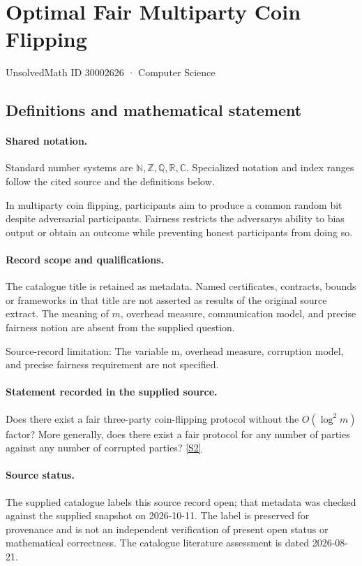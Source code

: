 \documentclass[11pt]{article}
\newcommand{\sref}[2]{\hyperlink{source:#1:#2}{[S#2]}}
\begin{document}
\setcounter{section}{30002625}
\section{Optimal Fair Multiparty Coin Flipping}\label{30002626}
{\small\sffamily UnsolvedMath ID 30002626 · Computer Science}
\subsection{Definitions and mathematical statement}

\paragraph{Shared notation.}Standard number systems are $\mathbb N,\mathbb Z,\mathbb Q,\mathbb R,\mathbb C$. Specialized notation and index ranges follow the cited source and the definitions below.


In multiparty coin flipping, participants aim to produce a common random bit despite adversarial participants. Fairness restricts the adversary\textquotesingle s ability to bias output or obtain an outcome while preventing honest participants from doing so.
\paragraph{Record scope and qualifications.}
The catalogue title is retained as metadata. Named certificates, contracts, bounds or frameworks in that title are not asserted as results of the original source extract.
The meaning of $m$, overhead measure, communication model, and precise fairness notion are absent from the supplied question.

Source-record limitation: The variable m, overhead measure, corruption model, and precise fairness requirement are not specified.
\paragraph{Statement recorded in the supplied source.}
Does there exist a fair three-party coin-flipping protocol without the $O(\log^2 m)$ factor? More generally, does there exist a fair protocol for any number of parties against any number of corrupted parties? \sref{30002626}{2}
\paragraph{Source status.}
The supplied catalogue labels this source record open; that metadata was checked against the supplied snapshot on 2026-10-11. The label is preserved for provenance and is not an independent verification of present open status or mathematical correctness. The catalogue literature assessment is dated 2026-08-21.
\end{document}
